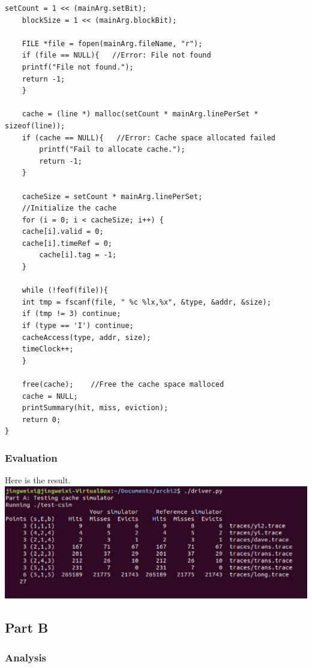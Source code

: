 \documentclass{article}
\begin{document}
\begin{lstlisting}[title=csim.c, frame=shadowbox]
    setCount = 1 << (mainArg.setBit);
    blockSize = 1 << (mainArg.blockBit);

    FILE *file = fopen(mainArg.fileName, "r");
    if (file == NULL){   //Error: File not found
	printf("File not found.");
	return -1;
    }

    cache = (line *) malloc(setCount * mainArg.linePerSet * sizeof(line));
	if (cache == NULL){   //Error: Cache space allocated failed
	    printf("Fail to allocate cache.");
	    return -1;
	}

    cacheSize = setCount * mainArg.linePerSet;
    //Initialize the cache
    for (i = 0; i < cacheSize; i++) {
	cache[i].valid = 0;
	cache[i].timeRef = 0;
        cache[i].tag = -1;
    }

    while (!feof(file)){
	int tmp = fscanf(file, " %c %lx,%x", &type, &addr, &size);
	if (tmp != 3) continue;
	if (type == 'I') continue;
	cacheAccess(type, addr, size);
	timeClock++;
    }

    free(cache);    //Free the cache space malloced
    cache = NULL;
    printSummary(hit, miss, eviction);
    return 0;
}

\end{lstlisting}


\subsubsection{Evaluation}

Here is the result. \\

\includegraphics[scale=0.43]{1.png}

\subsection{Part B}

\subsubsection{Analysis}
\end{document}
